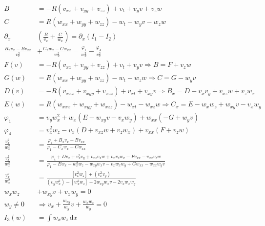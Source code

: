\documentclass[12pt,a4paper]{article}
\begin{document}
	\begin{align}
	  B &= -R \left(v_{xx} + v_{yy} + v_{zz} \right) + v_t + v_y v + v_z w \\
	  C &= R \left(w_{xx} + w_{yy} + w_{zz} \right) - w_t - w_y v - w_z w \\
	  \partial_x &\left( \frac{B}{v_x} + \frac{C}{w_x} \right) = \partial_x \left(I_1 - I_2 \right) \\
	  \frac{B_x v_x - B v_{xx}}{v_x^2} &+ \frac{C_x w_x - C w_{xx}}{w_x^2} = \frac{\varphi_1}{w_x^2} - \frac{\varphi_4}{v_x^2} \\
	  F(v) &= -R \left(v_{xx} + v_{yy} + v_{zz} \right) + v_t + v_y v \Rightarrow B = F + v_z w \\
	  G(w) &= R \left(w_{xx} + w_{yy} + w_{zz} \right) - w_t - w_z w \Rightarrow C = G - w_y v \\
	  D(v) &= -R \left(v_{xxx} + v_{xyy} + v_{xzz} \right) + v_{xt} + v_{xy} v \Rightarrow B_x = D + v_x v_y + v_{xz} w + v_z w_x \\
	  E(w) &= R \left(w_{xxx} + w_{xyy} + w_{xzz} \right) - w_{xt} - w_{xz} w \Rightarrow C_x = E - w_x w_z + w_{xy} v - v_x w_y \\
	  \varphi_1 &= v_y w_x^2 + w_x \left( E - w_{xy} v - v_x w_y \right) + w_{xx} \left( -G + w_y v \right) \\
	  \varphi_4 &= v_x^2 w_z - v_x \left( D + v_{xz} w + v_z w_x \right) + v_{xx} \left( F + v_z w \right) \\
	  \frac{v_x^2}{w_x^2} &= \frac{\varphi_4 + B_x v_x - B v_{xx}}{\varphi_1 - C_x w_x + C w_{xx}} \\
	  \frac{v_x^2}{w_x^2} &= \frac{\varphi_4 + Dv_x + v_x^2 v_y + v_{xz} v_x w + v_x v_z w_x - F v_{xx} - v_{xx} v_z w}{\varphi_1 - E w_x - w_x^2 w_z - w_{xy} w_x v - v_x w_x w_y + G w_{xx} - w_{xx} w_y v} \\
	  \frac{v_x^2}{w_x^2} &= \frac{[v_x^2 w_z] + (v_x^2 v_y)}{(v_y w_x^2) - [w_x^2 w_z] - 2 w_{xy} w_x v - 2 v_x w_x w_y} \\
	  w_x w_z &+ w_{xy} v + v_x w_y = 0 \\
	  w_y \neq 0 &\Rightarrow v_x + \frac{w_{xy}}{w_y} v + \frac{w_x w_z}{w_y} = 0 \\
	  I_3(w) &= \int{ w_x w_z \,\mathrm{d} x}
	\end{align}

	\begin{center}
	\end{center}
\end{document}
